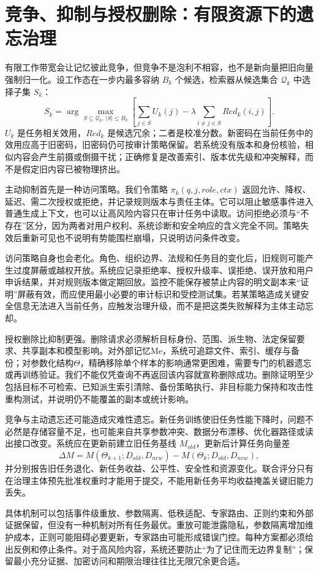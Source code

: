 \section{竞争、抑制与授权删除：有限资源下的遗忘治理}
\label{sec:competitive_active_forgetting}
有限工作带宽会让记忆彼此竞争，但竞争不是泡利不相容，也不是新向量把旧向量强制归一化。设工作态在一步内最多容纳 $B_k$ 个候选，检索器从候选集合 $\mathcal Q_k$ 中选择子集 $S_k$：
\[
S_k=\arg\max_{S\subseteq\mathcal Q_k,\,|S|\le B_k}
\left[\sum_{j\in S}U_k(j)-\lambda\sum_{i\ne j\in S}Red_k(i,j)\right].
\]
$U_k$ 是任务相关效用，$Red_k$ 是候选冗余；二者是校准分数。新密码在当前任务中的效用应高于旧密码，旧密码仍可按审计策略保留。若系统没有版本和身份核验，相似内容会产生前摄或倒摄干扰；正确修复是改善索引、版本优先级和冲突解释，而不是假定旧内容已被物理挤出。

主动抑制首先是一种访问策略。我们令策略 $\pi_k(q,j,role,ctx)$ 返回允许、降权、延迟、需二次授权或拒绝，并记录规则版本与责任主体。它可以阻止敏感事件进入普通生成上下文，也可以让高风险内容只在审计任务中读取。访问拒绝必须与“不存在”区分，因为两者对用户权利、系统诊断和安全响应的含义完全不同。策略失效后重新可见也不说明有势能围栏崩塌，只说明访问条件改变。

访问策略自身也会老化。角色、组织边界、法规和任务目的变化后，旧规则可能产生过度屏蔽或越权开放。系统应记录拒绝率、授权升级率、误拒绝、误开放和用户申诉结果，并对规则版本做定期回放。监控不能保存被禁止内容的明文副本来“证明”屏蔽有效，而应使用最小必要的审计标识和受控测试集。若某策略造成关键安全信息无法进入当前任务，应触发治理升级，而不是把这类失败解释为主体主动忘却。

授权删除比抑制更强。删除请求必须解析目标身份、范围、派生物、法定保留要求、共享副本和模型影响。对外部记忆Me，系统可追踪文件、索引、缓存与备份；对参数化结构$\Theta$，精确移除单个样本的影响通常更困难，需要专门的机器遗忘或再训练验证。我们不能仅凭查询不再返回该内容就宣称删除成功。删除证明至少包括目标不可检索、已知派生索引清除、备份策略执行、非目标能力保持和攻击性重构测试，并说明仍不能覆盖的副本或统计影响。

竞争与主动遗忘还可能造成灾难性遗忘。新任务训练使旧任务性能下降时，问题不必然是存储容量不足，也可能来自共享参数冲突、数据分布漂移、优化器路径或读出接口改变。系统应在更新前建立旧任务基线 $M_{old}$，更新后计算任务向量差
\[
\Delta M=M(\Theta_{k+1};D_{old},D_{new})-M(\Theta_k;D_{old},D_{new}),
\]
并分别报告旧任务退化、新任务收益、公平性、安全性和资源变化。联合评分只有在治理主体预先批准权重时才能用于提交，不能用新任务平均收益掩盖关键旧能力丢失。

具体机制可以包括事件级重放、参数隔离、低秩适配、专家路由、正则约束和外部证据保留，但没有一种机制对所有任务最优。重放可能泄露隐私，参数隔离增加维护成本，正则可能阻碍必要更新，专家路由可能形成错误门控。每种方案都必须给出反例和停止条件。对于高风险内容，系统还要防止“为了记住而无边界复制”；保留最小充分证据、加密访问和期限治理往往比无限冗余更合适。

